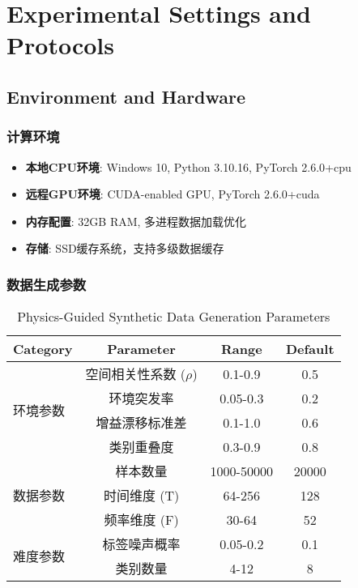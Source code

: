 \chapter{Experimental Settings and Protocols}

\section{Environment and Hardware}

\subsection{计算环境}
\begin{itemize}
    \item \textbf{本地CPU环境}: Windows 10, Python 3.10.16, PyTorch 2.6.0+cpu
    \item \textbf{远程GPU环境}: CUDA-enabled GPU, PyTorch 2.6.0+cuda
    \item \textbf{内存配置}: 32GB RAM, 多进程数据加载优化
    \item \textbf{存储}: SSD缓存系统，支持多级数据缓存
\end{itemize}

\subsection{数据生成参数}
\begin{table}[h!]
\centering
\caption{Physics-Guided Synthetic Data Generation Parameters}
\begin{tabular}{|l|c|c|c|}
\hline
\textbf{Category} & \textbf{Parameter} & \textbf{Range} & \textbf{Default} \\
\hline
\multirow{4}{*}{环境参数}
& 空间相关性系数 ($\rho$) & 0.1-0.9 & 0.5 \\
& 环境突发率 & 0.05-0.3 & 0.2 \\
& 增益漂移标准差 & 0.1-1.0 & 0.6 \\
& 类别重叠度 & 0.3-0.9 & 0.8 \\
\hline
\multirow{3}{*}{数据参数}
& 样本数量 & 1000-50000 & 20000 \\
& 时间维度 (T) & 64-256 & 128 \\
& 频率维度 (F) & 30-64 & 52 \\
\hline
\multirow{2}{*}{难度参数}
& 标签噪声概率 & 0.05-0.2 & 0.1 \\
& 类别数量 & 4-12 & 8 \\
\hline
\end{tabular}
\label{tab:data_gen_params}
\end{table}

